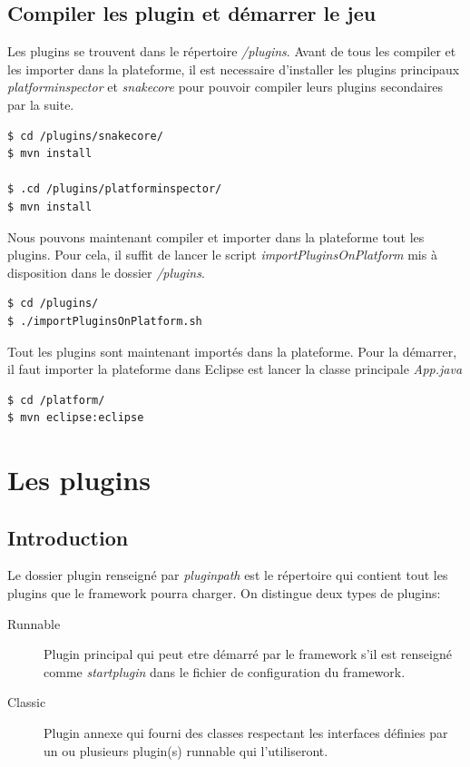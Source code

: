 \documentclass[12pt,a4paper]{article}
\begin{document}
\subsection{Compiler les plugin et démarrer le jeu}
Les plugins se trouvent dans le répertoire \emph{/plugins}. Avant de tous les compiler 
et les importer dans la plateforme, il est necessaire d'installer les plugins 
principaux \emph{platforminspector} et \emph{snakecore} pour pouvoir compiler leurs 
plugins secondaires par la suite.

\begin{lstlisting}[language=bash,caption=Installation des plugins principaux]
$ cd /plugins/snakecore/
$ mvn install

$ .cd /plugins/platforminspector/
$ mvn install
\end{lstlisting}

Nous pouvons maintenant compiler et importer dans la plateforme tout les plugins. 
Pour cela, il suffit de lancer le script \emph{importPluginsOnPlatform} mis à 
disposition dans le dossier \emph{/plugins}.

\begin{lstlisting}[language=bash,caption=Importer les plugins]
$ cd /plugins/
$ ./importPluginsOnPlatform.sh
\end{lstlisting}

Tout les plugins sont maintenant importés dans la plateforme. Pour la démarrer, il 
faut importer la plateforme dans Eclipse est lancer la classe principale \emph{App.java}

\begin{lstlisting}[language=bash,caption=Démarrer la plateforme]
$ cd /platform/
$ mvn eclipse:eclipse
\end{lstlisting}

\section{Les plugins}
\subsection{Introduction}
Le dossier plugin renseigné par \emph{pluginpath} est le répertoire qui contient 
tout les plugins que le framework pourra charger. On distingue deux types de 
plugins:

\begin{description}
	\item[Runnable] Plugin principal qui peut etre démarré par le framework s'il 
	est renseigné comme \emph{startplugin} dans le fichier de configuration du 
	framework.
	
	\item[Classic] Plugin annexe qui fourni des classes respectant les interfaces 
	définies par un ou plusieurs plugin(s) runnable qui l'utiliseront.
\end{description}
\end{document}
